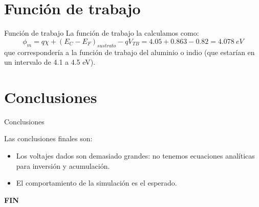 \documentclass{/home/daniel/GitHub/USC-Physics-Degree-Notes/Notes/Presentacion}
\begin{document}
\section{Función de trabajo}

\begin{frame}{Función de trabajo}
    La función de trabajo la calculamos como: 
    \begin{equation}
        \phi_m = q\chi  + (E_C-E_F)_{sustrato} - q V_{TB} = 4.05 + 0.863 - 0.82 = 4.078 \ \unit{eV}
    \end{equation}
    que correspondería a la función de trabajo del aluminio o indio (que estarían en un intervalo de 4.1 a 4.5 eV). 
\end{frame}

\section{Conclusiones}

\begin{frame}{Conclusiones}
    \begin{minipage}{0.9\linewidth}
    Las conclusiones finales son: 

    \begin{itemize}
        \item Los voltajes dados son demasiado grandes: no tenemos ecuaciones analíticas para inversión y acumulación. 
        \item El comportamiento de la simulación es el esperado. 
    \end{itemize}
    \end{minipage}
\end{frame}

\begin{frame}
    \begin{center}
    \Huge{\textbf{FIN}}
    \end{center}
\end{frame}
\end{document}
